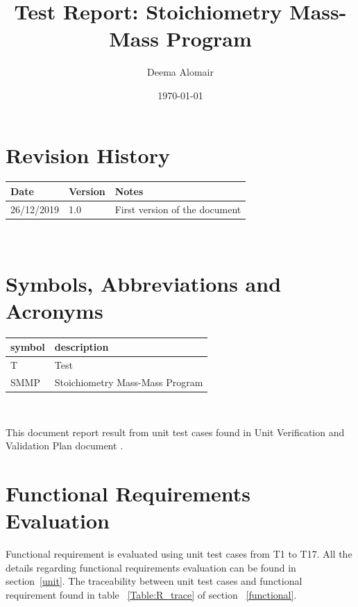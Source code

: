 \documentclass[12pt, titlepage]{article}
\begin{document}
\title{Test Report: Stoichiometry Mass-Mass Program} 
\author{Deema Alomair}
\date{\today}
	
\maketitle


\section{Revision History}

\begin{tabularx}{\textwidth}{p{3cm}p{2cm}X}
\toprule {\bf Date} & {\bf Version} & {\bf Notes}\\
\midrule
26/12/2019 & 1.0 & First version of the document\\
\bottomrule
\end{tabularx}

~\newpage

\section{Symbols, Abbreviations and Acronyms}

\renewcommand{\arraystretch}{1.2}
\begin{tabular}{l l} 
  \toprule		
  \textbf{symbol} & \textbf{description}\\
  \midrule 
  T & Test\\
  SMMP & Stoichiometry Mass-Mass Program\\
  \bottomrule
\end{tabular}\\

\newpage

\tableofcontents

\listoftables 

\listoffigures


\newpage


This document report result from unit test cases found in Unit  Verification and Validation Plan document \cite{UnitVnVPlan}.

\section{Functional Requirements Evaluation}

Functional requirement is evaluated using unit test cases from T1 to T17. All the details regarding functional requirements evaluation can be found in section~\ref{unit}. The traceability between unit test cases and functional requirement found in table ~\ref{Table:R_trace} of section ~\ref{functional}.
\end{document}

